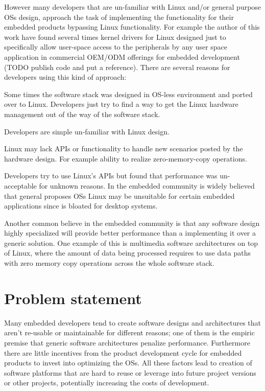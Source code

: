 However many developers that are un-familiar with Linux and/or general purpose \acp{OS} design, approach the task of implementing the functionality for their embedded products bypassing Linux functionality. For example the author of this work have found several times kernel drivers for Linux designed just to specifically allow user-space access to the peripherals by any user space application in commercial \ac{OEM}/\ac{ODM} offerings for embedded development (TODO publish code and put a reference).  There are several reasons for developers using this kind of approach:
\begin{itemize*}
\item Some times the software stack was designed in \ac{OS}-less environment and ported over to Linux. Developers just try to find a way to get the Linux hardware management out of the way of the software stack.
\item Developers are simple un-familiar with Linux design.
\item Linux may lack APIs or functionality to handle new scenarios posted by the hardware design. For example ability to realize zero-memory-copy operations.
\item Developers try to use Linux's APIs but found that performance was un-acceptable for unknown reasons. In the embedded community is widely believed that general proposes  \acp{OS} Linux may be unsuitable for certain embedded applications since is bloated for desktop systems.
\end{itemize*}

Another common believe in the embedded community is that any software design highly specialized will provide better performance than a implementing it over a generic solution. One example of this is multimedia software architectures on top of Linux, where the amount of data being processed requires to use data paths with zero memory copy operations across the whole software stack.
 
\section{Problem statement}
Many embedded developers tend to create software designs and architectures that aren't re-usable or maintainable for different reasons; one of them is the empiric premise that generic software architectures penalize performance. Furthermore there are little incentives from the product development cycle for embedded products to invest into optimizing the \acp{OS}. All these factors lead to creation of software platforms that are hard to reuse or leverage into future project versions or other projects, potentially increasing the costs of development.

